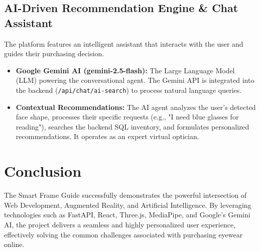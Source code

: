 \documentclass[12pt,a4paper]{article}
\begin{document}
\subsection{AI-Driven Recommendation Engine \& Chat Assistant}
The platform features an intelligent assistant that interacts with the user and guides their purchasing decision.
\begin{itemize}[label=\textcolor{primary}{$\bullet$}]
    \item \textbf{Google Gemini AI (gemini-2.5-flash):} The Large Language Model (LLM) powering the conversational agent. The Gemini API is integrated into the backend (\texttt{/api/chat/ai-search}) to process natural language queries.
    \item \textbf{Contextual Recommendations:} The AI agent analyzes the user's detected face shape, processes their specific requests (e.g., "I need blue glasses for reading"), searches the backend SQL inventory, and formulates personalized recommendations. It operates as an expert virtual optician.
\end{itemize}

\section{Conclusion}
The Smart Frame Guide successfully demonstrates the powerful intersection of Web Development, Augmented Reality, and Artificial Intelligence. By leveraging technologies such as FastAPI, React, Three.js, MediaPipe, and Google's Gemini AI, the project delivers a seamless and highly personalized user experience, effectively solving the common challenges associated with purchasing eyewear online.
\end{document}

